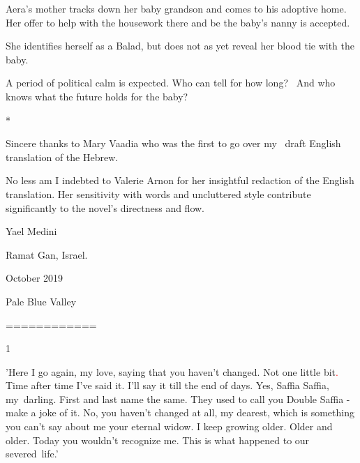 \documentclass[letterpaper]{article}
\begin{document}
\textcolor[rgb]{0.13333334,0.13333334,0.13333334}{Aera's mother tracks down her baby grandson and comes to his adoptive
home. Her offer to help with the housework there and be the baby's nanny is accepted. }


\bigskip

\textcolor[rgb]{0.13333334,0.13333334,0.13333334}{She identifies herself as a Balad, but does not as yet reveal her
blood tie with the baby.}

\textcolor[rgb]{0.13333334,0.13333334,0.13333334}{A period of political calm is expected. Who can tell for how long?
\ And who knows what the future holds for the baby? }


\bigskip

*

Sincere thanks to Mary Vaadia who was the first to go over my \ draft English translation of the Hebrew. 


\bigskip

No less am I indebted to Valerie Arnon for her insightful redaction of the English translation. Her sensitivity with
words and uncluttered style contribute significantly to the novel's directness and flow.


\bigskip

Yael Medini

Ramat Gan, Israel.

October 2019 


\bigskip

\clearpage
Pale Blue Valley

============


\bigskip


\bigskip

\textcolor[rgb]{0.13333334,0.13333334,0.13333334}{1}

\textcolor[rgb]{0.13333334,0.13333334,0.13333334}{{}'Here I go }again, my
love,\textcolor[rgb]{0.13333334,0.13333334,0.13333334}{ saying that you haven't changed. Not one little
bit}\textcolor{red}{. }\textcolor[rgb]{0.13333334,0.13333334,0.13333334}{Time after time I've said it. I'll say it till
the end of days. Yes, Saffia Saffia, my~darling. First and last name the same. }They used to call you Double Saffia -
make a joke of it.\textcolor[rgb]{0.13333334,0.13333334,0.13333334}{ No,
you}\textit{\textcolor[rgb]{0.13333334,0.13333334,0.13333334}{
}}\textcolor[rgb]{0.13333334,0.13333334,0.13333334}{haven't changed }at all,
\textcolor[rgb]{0.13333334,0.13333334,0.13333334}{my dearest, }which is something you
\textcolor[rgb]{0.13333334,0.13333334,0.13333334}{can't say about me your
}eternal\textcolor[rgb]{0.13333334,0.13333334,0.13333334}{ widow. I keep growing older. Older and older.
}Today\textcolor[rgb]{0.13333334,0.13333334,0.13333334}{ you wouldn't recognize me. This is what happened to our
severed~life.'}
\end{document}
